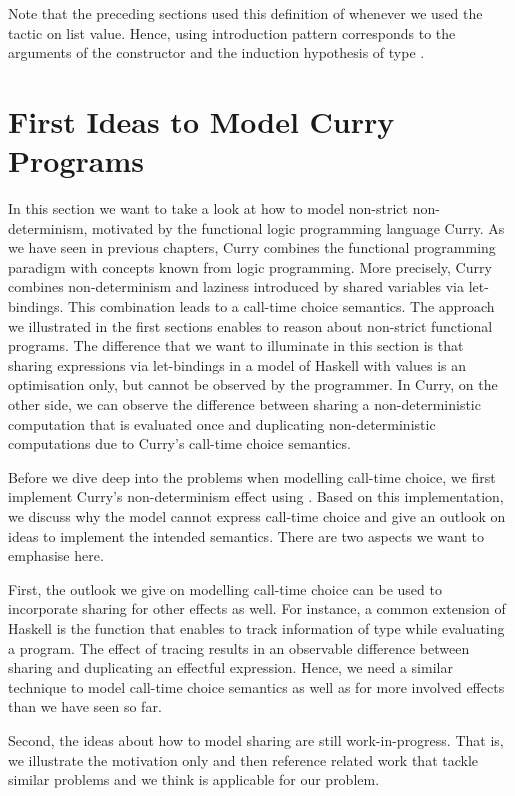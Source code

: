 Note that the preceding sections used this definition of  whenever we used the tactic  on list
value.
Hence, using introduction pattern \cinl{[ | fy fys IH ]} corresponds to the arguments of the  constructor and the induction hypothesis of type .

\section{First Ideas to Model Curry Programs}

In this section we want to take a look at how to model non-strict non-determinism, motivated by the functional logic programming language Curry.
As we have seen in previous chapters, Curry combines the functional programming paradigm with concepts known from logic programming.
More precisely, Curry combines non-determinism and laziness introduced by shared variables via let-bindings.
This combination leads to a call-time choice semantics.
The approach we illustrated in the first sections enables to reason about non-strict functional programs.
The difference that we want to illuminate in this section is that sharing expressions via let-bindings in a model of Haskell with  values is an optimisation only, but cannot be observed by the programmer.
In Curry, on the other side, we can observe the difference between sharing a non-deterministic computation that is evaluated once and duplicating non-deterministic computations due to Curry's call-time choice semantics.

Before we dive deep into the problems when modelling call-time choice, we first implement Curry's non-determinism effect using .
Based on this implementation, we discuss why the model cannot express call-time choice and give an outlook on ideas to implement the intended semantics.
There are two aspects we want to emphasise here.

First, the outlook we give on modelling call-time choice can be used to incorporate sharing for other effects as well.
For instance, a common extension of Haskell is the function  that enables to track information of type  while evaluating a program.
The effect of tracing results in an observable difference between sharing and duplicating an effectful expression.
Hence, we need a similar technique to model call-time choice semantics as well as for more involved effects than we have seen so far.

Second, the ideas about how to model sharing are still work-in-progress.
That is, we illustrate the motivation only and then reference related work that tackle similar problems and we think is applicable for our problem.


